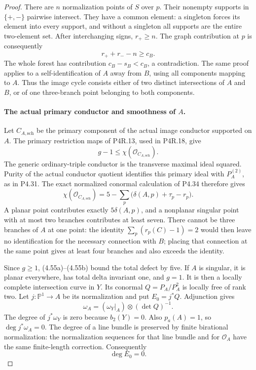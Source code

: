 \begin{proof}
There are $n$ normalization points of $S$ over $p$.
Their nonempty supports in $\{+,-\}$ pairwise intersect.
They have a common element: a singleton forces its element
into every support, and without a singleton all supports
are the entire two-element set. After interchanging signs,
$r_+\ge n$. The graph contribution at $p$ is consequently
\[
                  r_++r_--n\ge c_B.
\]
The whole forest has contribution $c_B-s_B<c_B$, a
contradiction. The same proof applies to a self-identification
of $A$ away from $B$, using all components mapping to $A$.
Thus the image cycle consists either of two distinct
intersections of $A$ and $B$, or of one three-branch point
belonging to both components.

\paragraph{The actual primary conductor and smoothness of $A$.}
Let $C_{A,\mathrm{sch}}$ be the primary component of the
actual image conductor supported on $A$. The primary
restriction maps of P4R.13, used in P4R.18, give
\[
                    g-1\le\chi(\mathcal O_{C_{A,\mathrm{sch}}}).
                                                            \tag{4.55a}
\]
The generic ordinary-triple conductor is the transverse
maximal ideal squared. Purity of the actual conductor
quotient identifies this primary ideal with $P_A^{(2)}$,
as in P4.31. The exact normalized conormal calculation of
P4.34 therefore gives
\[
 \chi(\mathcal O_{C_{A,\mathrm{sch}}})
       =5-\sum_p\bigl(\delta(A,p)+\tau_p-r_p\bigr).
                                                            \tag{4.55b}
\]
A planar point contributes exactly $5\delta(A,p)$, and a
nonplanar singular point with at most two branches contributes
at least seven. There cannot be three branches of $A$ at one
point: the identity
$\sum_p(r_p(C)-1)=2$ would then leave no identification for
the necessary connection with $B$; placing that connection
at the same point gives at least four branches and also
exceeds the identity.

Since $g\ge1$, (4.55a)--(4.55b) bound the total defect by
five. If $A$ is singular, it is planar everywhere, has total
delta invariant one, and $g=1$. It is then a locally complete
intersection curve in $Y$. Its conormal
$Q=P_A/P_A^2$ is locally free of rank two. Let
$j:\mathbb P^1\to A$ be its normalization and put $E_0=j^*Q$.
Adjunction gives
\[
             \omega_A=(\omega_Y|_A)\otimes(\det Q)^{-1}.
\]
The degree of $j^*\omega_Y$ is zero because $b_2(Y)=0$.
Also $p_a(A)=1$, so $\deg j^*\omega_A=0$. The degree of a
line bundle is preserved by finite birational normalization:
the normalization sequences for that line bundle and for
$\mathcal O_A$ have the same finite-length correction.
Consequently
\[
                              \deg E_0=0.                 \tag{4.55c}
\]


\end{proof}
